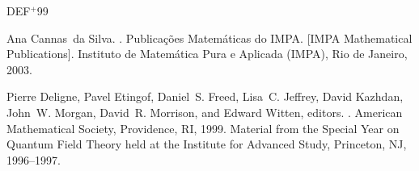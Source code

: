 % 
% 

\newpage
\newcommand{\etalchar}[1]{$^{#1}$}
\begin{thebibliography}{DEF{\etalchar{+}}99}

Ana Cannas~da Silva.
.
\newblock Publica\c c\~oes Matem\'aticas do IMPA. [IMPA Mathematical
  Publications]. Instituto de Matem\'atica Pura e Aplicada (IMPA), Rio de
  Janeiro, 2003.

\bibitem[DEF{\etalchar{+}}99]{QFST}
Pierre Deligne, Pavel Etingof, Daniel~S. Freed, Lisa~C. Jeffrey, David Kazhdan,
  John~W. Morgan, David~R. Morrison, and Edward Witten, editors.
.
\newblock American Mathematical Society, Providence, RI, 1999.
\newblock Material from the Special Year on Quantum Field Theory held at the
  Institute for Advanced Study, Princeton, NJ, 1996--1997.

\end{thebibliography}
